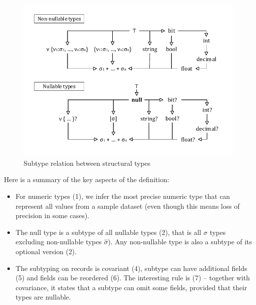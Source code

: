 \documentclass[preprint]{sigplanconf}
\newcommand{\kvd}[1]{\textnormal{\textcolor{kvdclr}{\sffamily #1}}}
\begin{document}

\begin{figure}
\begin{center}
\includegraphics[scale=0.75,trim=5mm 5mm 5mm 5mm,clip]{images/hierarchy.pdf} %
\end{center}
\vspace{-0.5em}
\caption{Subtype relation between structural types}
\label{fig:subtyping-diagram}
\vspace{-0.5em}
\end{figure}

\noindent
Here is a summary of the key aspects of the definition:

\begin{itemize}
\item For numeric types (1), we infer the most precise numeric type that can represent all values
  from a sample dataset (even though this means loss of precision in some cases).

\item The \kvd{null} type is a subtype of all nullable types (2), that is all
  $\sigma$ types excluding non-nullable types $\hat{\sigma}$). Any non-nullable type is also a
  subtype of its optional version (2).

\item The subtyping on records is covariant (4), subtype can have
  additional fields (5) and fields can  be reordered (6). The interesting rule
  is (7) -- together with covariance, it states that a subtype can omit some
  fields, provided that their types are nullable.
\end{itemize}
\end{document}
